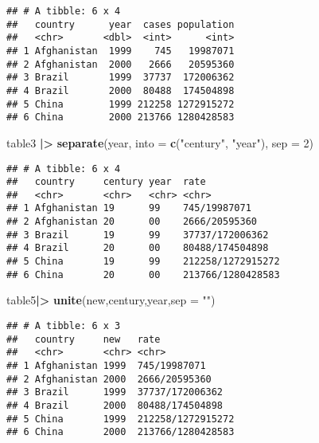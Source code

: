 \documentclass[
]{article}
\newenvironment{Shaded}{\begin{snugshade}}{\end{snugshade}}
\newcommand{\AttributeTok}[1]{\textcolor[rgb]{0.13,0.29,0.53}{#1}}
\newcommand{\DecValTok}[1]{\textcolor[rgb]{0.00,0.00,0.81}{#1}}
\newcommand{\FunctionTok}[1]{\textcolor[rgb]{0.13,0.29,0.53}{\textbf{#1}}}
\newcommand{\NormalTok}[1]{#1}
\newcommand{\SpecialCharTok}[1]{\textcolor[rgb]{0.81,0.36,0.00}{\textbf{#1}}}
\newcommand{\StringTok}[1]{\textcolor[rgb]{0.31,0.60,0.02}{#1}}
\begin{document}
\begin{verbatim}
## # A tibble: 6 x 4
##   country      year  cases population
##   <chr>       <dbl>  <int>      <int>
## 1 Afghanistan  1999    745   19987071
## 2 Afghanistan  2000   2666   20595360
## 3 Brazil       1999  37737  172006362
## 4 Brazil       2000  80488  174504898
## 5 China        1999 212258 1272915272
## 6 China        2000 213766 1280428583
\end{verbatim}

\begin{Shaded}
\begin{Highlighting}[]
\NormalTok{table3 }\SpecialCharTok{|\textgreater{}}
  \FunctionTok{separate}\NormalTok{(year, }\AttributeTok{into =} \FunctionTok{c}\NormalTok{(}\StringTok{"century"}\NormalTok{, }\StringTok{"year"}\NormalTok{), }\AttributeTok{sep =} \DecValTok{2}\NormalTok{)}
\end{Highlighting}
\end{Shaded}

\begin{verbatim}
## # A tibble: 6 x 4
##   country     century year  rate             
##   <chr>       <chr>   <chr> <chr>            
## 1 Afghanistan 19      99    745/19987071     
## 2 Afghanistan 20      00    2666/20595360    
## 3 Brazil      19      99    37737/172006362  
## 4 Brazil      20      00    80488/174504898  
## 5 China       19      99    212258/1272915272
## 6 China       20      00    213766/1280428583
\end{verbatim}

\begin{Shaded}
\begin{Highlighting}[]
\NormalTok{table5}\SpecialCharTok{|\textgreater{}}
  \FunctionTok{unite}\NormalTok{(new,century,year,}\AttributeTok{sep =} \StringTok{""}\NormalTok{)}
\end{Highlighting}
\end{Shaded}

\begin{verbatim}
## # A tibble: 6 x 3
##   country     new   rate             
##   <chr>       <chr> <chr>            
## 1 Afghanistan 1999  745/19987071     
## 2 Afghanistan 2000  2666/20595360    
## 3 Brazil      1999  37737/172006362  
## 4 Brazil      2000  80488/174504898  
## 5 China       1999  212258/1272915272
## 6 China       2000  213766/1280428583
\end{verbatim}
\end{document}
